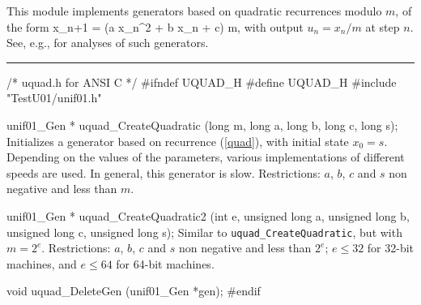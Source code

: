 
This module implements generators based on quadratic recurrences 
modulo $m$, of the form
\eq
  x_{n+1} = (a x_n^2 + b x_n + c) \mod m,          
\endeq
with output $u_n = x_n/m$ at step $n$.
See, e.g., \cite{rEIC87a,rEIC97d,rEMM97a,rKNU98a}
for analyses of such generators.


\bigskip
\hrule
\code
\hide
/* uquad.h for ANSI C */
#ifndef UQUAD_H
#define UQUAD_H
\endhide
#include "TestU01/unif01.h"


unif01_Gen * uquad_CreateQuadratic (long m, long a, long b, long c, long s);
\endcode
  \tab  Initializes a generator based on recurrence (\ref{quad}),
   with initial state $x_0 = s$.
%
   Depending on the values of the parameters, various implementations 
   of different speeds are used.  In general, this generator
   is slow.  Restrictions: $a$, $b$, $c$ and $s$ non
   negative and less than $m$.
 \endtab
\code


unif01_Gen * uquad_CreateQuadratic2 (int e, unsigned long a,
    unsigned long b, unsigned long c, unsigned long s);
\endcode
  \tab  Similar to {\tt uquad\_CreateQuadratic}, but with $m=2^e$.
   Restrictions: $a$, $b$, $c$ and $s$ non negative and
   less than $2^e$; $e \le 32$ for 32-bit machines,
   and $e \le 64$ for 64-bit machines.
 \endtab


\code

void uquad_DeleteGen (unif01_Gen *gen);
\endcode
 \tab \DelGen
 \endtab
\code
\hide
#endif
\endhide
\endcode
